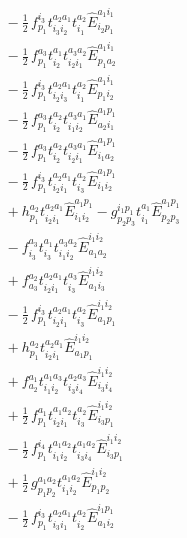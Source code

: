 \documentclass[11pt]{article}
\begin{document}
\begin{align}
&\quad - \tfrac{1}{2}\, f^{i_{3}}_{p_{1}} t^{a_{2}a_{1}}_{i_{3}i_{2}} t^{a_{2}}_{i_{1}} \hat{E}^{a_{1}i_{1}}_{i_{2}p_{1}} \\
&\quad - \tfrac{1}{2}\, f^{a_{3}}_{p_{1}} t^{a_{1}}_{i_{2}} t^{a_{3}a_{2}}_{i_{2}i_{1}} \hat{E}^{a_{1}i_{1}}_{p_{1}a_{2}} \\
&\quad - \tfrac{1}{2}\, f^{i_{3}}_{p_{1}} t^{a_{2}a_{1}}_{i_{2}i_{3}} t^{a_{2}}_{i_{1}} \hat{E}^{a_{1}i_{1}}_{p_{1}i_{2}} \\
&\quad - \tfrac{1}{2}\, f^{a_{3}}_{p_{1}} t^{a_{2}}_{i_{2}} t^{a_{3}a_{1}}_{i_{1}i_{2}} \hat{E}^{a_{1}p_{1}}_{a_{2}i_{1}} \\
&\quad - \tfrac{1}{2}\, f^{a_{3}}_{p_{1}} t^{a_{2}}_{i_{2}} t^{a_{3}a_{1}}_{i_{2}i_{1}} \hat{E}^{a_{1}p_{1}}_{i_{1}a_{2}} \\
&\quad - \tfrac{1}{2}\, f^{i_{3}}_{p_{1}} t^{a_{2}a_{1}}_{i_{2}i_{1}} t^{a_{2}}_{i_{3}} \hat{E}^{a_{1}p_{1}}_{i_{1}i_{2}} \\
&\quad + h^{a_{2}}_{p_{1}} t^{a_{2}a_{1}}_{i_{2}i_{1}} \hat{E}^{a_{1}p_{1}}_{i_{1}i_{2}} - g^{i_{1}p_{1}}_{p_{2}p_{3}} t^{a_{1}}_{i_{1}} \hat{E}^{a_{1}p_{1}}_{p_{2}p_{3}} \\
&\quad - f^{a_{3}}_{i_{3}} t^{a_{1}}_{i_{3}} t^{a_{3}a_{2}}_{i_{1}i_{2}} \hat{E}^{i_{1}i_{2}}_{a_{1}a_{2}} \\
&\quad + f^{a_{2}}_{a_{3}} t^{a_{2}a_{1}}_{i_{2}i_{1}} t^{a_{3}}_{i_{3}} \hat{E}^{i_{1}i_{2}}_{a_{1}i_{3}} \\
&\quad - \tfrac{1}{2}\, f^{i_{3}}_{p_{1}} t^{a_{2}a_{1}}_{i_{2}i_{1}} t^{a_{2}}_{i_{3}} \hat{E}^{i_{1}i_{2}}_{a_{1}p_{1}} \\
&\quad + h^{a_{2}}_{p_{1}} t^{a_{2}a_{1}}_{i_{2}i_{1}} \hat{E}^{i_{1}i_{2}}_{a_{1}p_{1}} \\
&\quad + f^{a_{1}}_{a_{2}} t^{a_{1}a_{3}}_{i_{1}i_{2}} t^{a_{2}a_{3}}_{i_{3}i_{4}} \hat{E}^{i_{1}i_{2}}_{i_{3}i_{4}} \\
&\quad + \tfrac{1}{2}\, f^{a_{1}}_{p_{1}} t^{a_{1}a_{2}}_{i_{2}i_{1}} t^{a_{2}}_{i_{3}} \hat{E}^{i_{1}i_{2}}_{i_{3}p_{1}} \\
&\quad - \tfrac{1}{2}\, f^{i_{4}}_{p_{1}} t^{a_{1}a_{2}}_{i_{1}i_{2}} t^{a_{1}a_{2}}_{i_{3}i_{4}} \hat{E}^{i_{1}i_{2}}_{i_{3}p_{1}} \\
&\quad + \tfrac{1}{2}\, g^{a_{1}a_{2}}_{p_{1}p_{2}} t^{a_{1}a_{2}}_{i_{1}i_{2}} \hat{E}^{i_{1}i_{2}}_{p_{1}p_{2}} \\
&\quad - \tfrac{1}{2}\, f^{i_{3}}_{p_{1}} t^{a_{2}a_{1}}_{i_{3}i_{1}} t^{a_{2}}_{i_{2}} \hat{E}^{i_{1}p_{1}}_{a_{1}i_{2}} \\

\end{align}
\end{document}
